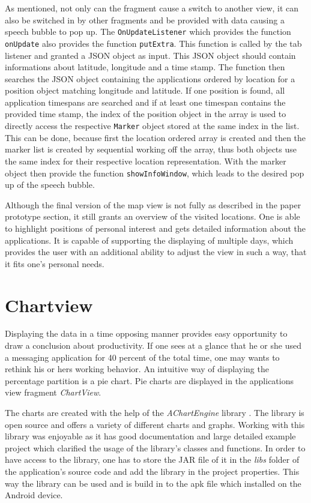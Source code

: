 As mentioned, not  only can the fragment cause a switch to another view, it can also be switched in by other fragments and be provided with data causing a speech bubble to pop up. The \lstinline$OnUpdateListener$ which provides the function \lstinline$onUpdate$ also provides the function \lstinline$putExtra$. This function is called by the tab listener and granted a JSON object as input. This JSON object should contain informations about latitude, longitude and a time stamp. The function then searches the JSON object containing the applications ordered by location for a position object matching longitude and latitude. If one position is found, all application timespans are searched and if at least one timespan contains the provided time stamp, the index of the position object in the array is used to directly access the respective \lstinline$Marker$ object stored at the same index in the list. This can be done, because first the location ordered array is created and then the marker list is created by sequential working off the array, thus both objects use the same index for their respective location representation. With the marker object then provide the function \lstinline$showInfoWindow$, which leads to the desired pop up of the speech bubble.

Although  the final version of the map view is not fully as described in the paper prototype section, it still grants an overview of the visited locations. One is able to highlight positions of personal interest and gets detailed information about the applications. It is capable of supporting the displaying of multiple days, which provides the user with an additional ability to adjust the view in such a way, that it fits one's personal needs.



\newpage
\section{Chartview}
Displaying the data in a time opposing manner provides easy opportunity to draw a conclusion about productivity. If one sees at a glance that he or she used a messaging application for 40 percent of the total time, one may wants to rethink his or hers working behavior. An intuitive way of displaying the percentage partition is a pie chart. Pie charts are displayed in the applications view fragment \emph{ChartView}.

The  charts are created with the help of the \emph{AChartEngine} library \cite{achartengine}. The library is open source and offers a variety of different charts and graphs. Working with this library was enjoyable as it has good documentation and large detailed example project which clarified the usage of the library's classes and functions. In order to have access to the library, one has to store the JAR file of it in the \emph{libs} folder of the application's source code and add the library in the project properties. This way the library can be used and is build in to the apk file which installed on the Android device.


